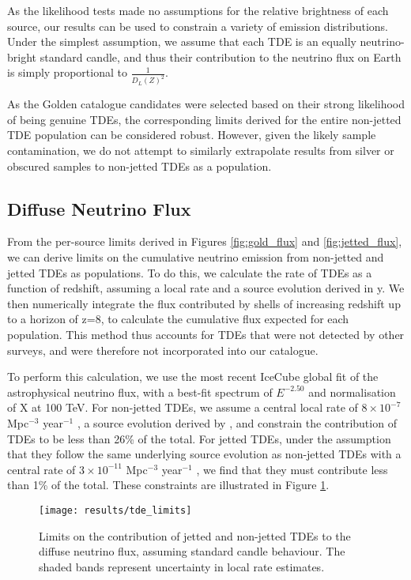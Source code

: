 As the likelihood tests made no assumptions for the relative brightness of each source, our results can be used to constrain a variety of emission distributions. Under the simplest assumption, we assume that each TDE is an equally neutrino-bright standard candle, and thus their contribution to the neutrino flux on Earth is simply proportional to $\frac{1}{D_{L}(Z)^{2}}$. 

As the Golden catalogue candidates were selected based on their strong likelihood of being genuine TDEs, the corresponding limits derived for the entire non-jetted TDE population can be considered robust. However, given the likely sample contamination, we do not attempt to similarly extrapolate results from silver or obscured samples to non-jetted TDEs as a population.

\subsection{Diffuse Neutrino Flux}

From the per-source limits derived in Figures \ref{fig:gold_flux} and \ref{fig:jetted_flux}, we can derive limits on the cumulative neutrino emission from non-jetted and jetted TDEs as populations. To do this, we calculate the rate of TDEs as a function of redshift, assuming a local rate and a source evolution derived in y. We then numerically integrate the flux contributed by shells of increasing redshift up to a horizon of z=8, to calculate the cumulative flux expected for each population. This method thus accounts for TDEs that were not detected by other surveys, and were therefore not incorporated into our catalogue.

To perform this calculation, we use the most recent IceCube global fit of the astrophysical neutrino flux, with a best-fit spectrum of $E^{-2.50}$ and normalisation of X at 100 TeV. For non-jetted TDEs, we assume a central local rate of $8 \times 10^{-7}$ Mpc$^{-3}$ year$^{-1}$ , a source evolution derived by \cite{Sun:2015bda}, and constrain the contribution of TDEs to be less than 26\% of the total. For jetted TDEs, under the assumption that they follow the same underlying source evolution as non-jetted TDEs with a central rate of $3 \times 10^{-11}$ Mpc$^{-3}$ year$^{-1}$ , we find that they must contribute less than 1\% of the total.  These constraints are illustrated in Figure \ref{fig:DiffuseFlux}.

\begin{figure}[!ht]
	\centering \texttt{[image: results/tde\_limits]}
	\caption{Limits on the contribution of jetted and non-jetted TDEs to the diffuse neutrino flux, assuming standard candle behaviour. The shaded bands represent uncertainty in local rate estimates.}
	\label{fig:DiffuseFlux}
\end{figure}

